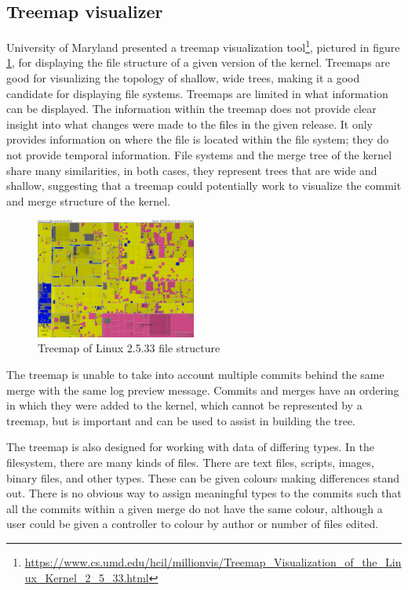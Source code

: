 \documentclass[conference, draftclsnofoot, draft]{IEEEtran}
\begin{document}
\subsection{Treemap visualizer}

University of Maryland presented a treemap visualization
tool\footnote{\url{https://www.cs.umd.edu/hcil/millionvis/Treemap_Visualization_of_the_Linux_Kernel_2_5_33.html}},
pictured in figure \ref{fig:treemap}, for displaying the file structure of a given
version of the kernel. Treemaps are good for visualizing the topology of shallow,
wide trees, making it a good candidate for displaying file systems. Treemaps are
limited in what information can be displayed. The information within the treemap
does not provide clear insight into what changes were made to the files in the given
release. It only provides information on where the file is located within the file
system; they do not provide temporal information. File systems and the merge
tree of the kernel share many similarities, in both cases, they represent trees that
are wide and shallow, suggesting that a treemap could potentially work to visualize
the commit and merge structure of the kernel.

\begin{figure}
        \centering
        \includegraphics[width=0.47\textwidth]{figures/kernel-files.png}
        \caption{Treemap of Linux 2.5.33 file structure}
        \label{fig:treemap}
\end{figure}

The treemap is unable to take into account multiple commits behind the same merge
with the same log preview message. Commits and merges have an ordering in which they
were added to the kernel, which cannot be represented by a treemap, but is important
and can be used to assist in building the tree.

The treemap is also designed for working with data of differing types. In the
filesystem, there are many kinds of files. There are text files, scripts, images,
binary files, and other types. These can be given colours making differences stand
out. There is no obvious way to assign meaningful types to the commits such that all
the commits within a given merge do not have the same colour, although a user
could be given a controller to colour by author or number of files edited.
\end{document}
